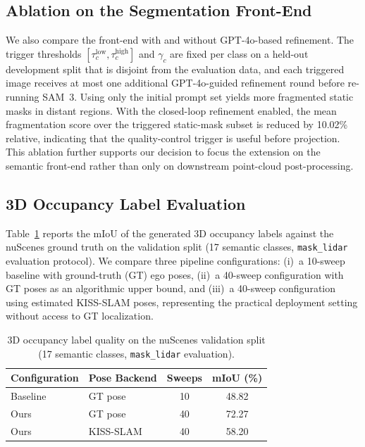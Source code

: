 \documentclass[conference]{IEEEtran}
\begin{document}
\subsection{Ablation on the Segmentation Front-End}
We also compare the front-end with and without GPT-4o-based refinement. The trigger thresholds $[\tau_c^{\mathrm{low}}, \tau_c^{\mathrm{high}}]$ and $\gamma_c$ are fixed per class on a held-out development split that is disjoint from the evaluation data, and each triggered image receives at most one additional GPT-4o-guided refinement round before re-running SAM~3. Using only the initial prompt set yields more fragmented static masks in distant regions. With the closed-loop refinement enabled, the mean fragmentation score over the triggered static-mask subset is reduced by 10.02\% relative, indicating that the quality-control trigger is useful before projection. This ablation further supports our decision to focus the extension on the semantic front-end rather than only on downstream point-cloud post-processing.

\subsection{3D Occupancy Label Evaluation}
Table~\ref{tab:occupancy} reports the mIoU of the generated 3D occupancy labels against the nuScenes ground truth on the validation split (17 semantic classes, \texttt{mask\_lidar} evaluation protocol). We compare three pipeline configurations: (i)~a 10-sweep baseline with ground-truth (GT) ego poses, (ii)~a 40-sweep configuration with GT poses as an algorithmic upper bound, and (iii)~a 40-sweep configuration using estimated KISS-SLAM poses, representing the practical deployment setting without access to GT localization.

\begin{table}[t]
  \caption{3D occupancy label quality on the nuScenes validation split (17 semantic classes, \texttt{mask\_lidar} evaluation).}
  \label{tab:occupancy}
  \centering
  \begin{tabular}{llcc}
    \toprule
    Configuration & Pose Backend & Sweeps & mIoU (\%) \\
    \midrule
    Baseline & GT pose      & 10 & 48.82 \\
    Ours     & GT pose      & 40 & 72.27 \\
    Ours     & KISS-SLAM    & 40 & 58.20 \\
    \bottomrule
  \end{tabular}
\end{table}
\end{document}
